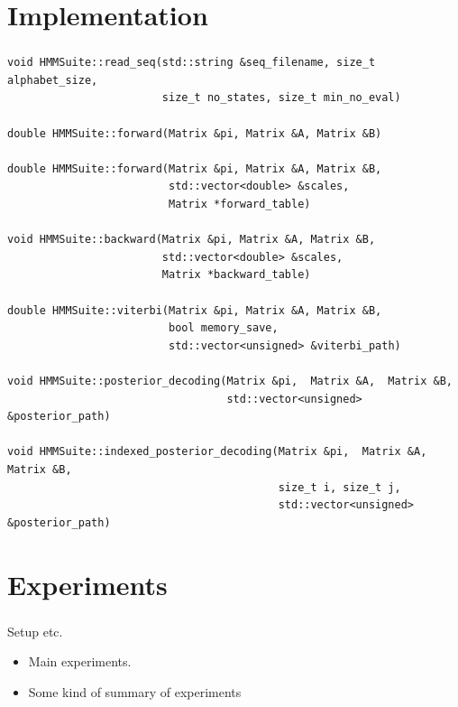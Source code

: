 \documentclass[english,notes]{beamer}
\begin{document}
\section{Implementation}

\begin{frame}[fragile]
  \frametitle{\insertsection}
\begin{verbatim}
void HMMSuite::read_seq(std::string &seq_filename, size_t alphabet_size,
                        size_t no_states, size_t min_no_eval)

double HMMSuite::forward(Matrix &pi, Matrix &A, Matrix &B)

double HMMSuite::forward(Matrix &pi, Matrix &A, Matrix &B,
                         std::vector<double> &scales,
                         Matrix *forward_table)

void HMMSuite::backward(Matrix &pi, Matrix &A, Matrix &B,
                        std::vector<double> &scales,
                        Matrix *backward_table)

double HMMSuite::viterbi(Matrix &pi, Matrix &A, Matrix &B,
                         bool memory_save,
                         std::vector<unsigned> &viterbi_path)

void HMMSuite::posterior_decoding(Matrix &pi,  Matrix &A,  Matrix &B,
                                  std::vector<unsigned> &posterior_path)

void HMMSuite::indexed_posterior_decoding(Matrix &pi,  Matrix &A,  Matrix &B,
                                          size_t i, size_t j,
                                          std::vector<unsigned> &posterior_path)
\end{verbatim}
\end{frame}

\section{Experiments}

\begin{frame}
  \frametitle{\insertsection}
  Setup etc.
  \begin{itemize}
    \tiny
  \item Main experiments.
  \item Some kind of summary of experiments
  \end{itemize}
\end{frame}
\end{document}
